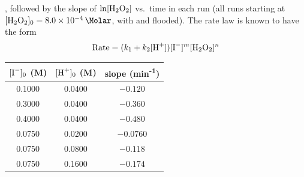 \documentclass{apchem-exam}
\begin{document}

, followed by the
slope of $\ln[\ce{H2O2}]$ vs.\ time in each run (all runs starting at
$[\ce{H2O2}]_0 = \SI{8.0e-4}{\Molar}$, with  and  flooded).
The rate law is known to have the form
\[\text{Rate} = (k_1 + k_2[\ce{H^+}])[\ce{I^-}]^m[\ce{H2O2}]^n\]

\begin{center}
\begin{tabular}{ccc}
\toprule
$[\ce{I^-}]_0$ (M) & $[\ce{H^+}]_0$ (M) & slope (min\textsuperscript{-1})\\
\midrule
0.1000 & 0.0400 & $-0.120$\\
0.3000 & 0.0400 & $-0.360$\\
0.4000 & 0.0400 & $-0.480$\\
0.0750 & 0.0200 & $-0.0760$\\
0.0750 & 0.0800 & $-0.118$\\
0.0750 & 0.1600 & $-0.174$\\
\bottomrule
\end{tabular}
\end{center}
\end{document}
